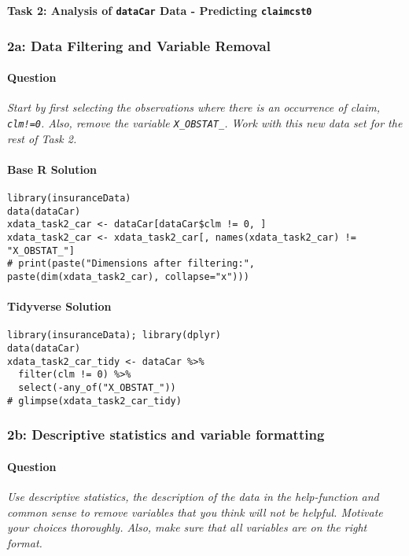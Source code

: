 \documentclass[12pt,a4paper]{article}
\newcommand{\Robject}[1]{\texttt{#1}} %
\newcommand{\Rcode}[1]{\texttt{#1}} %
\begin{document}
\vspace{1em}
\textbf{\Large Task 2: Analysis of \Robject{dataCar} Data - Predicting \Robject{claimcst0}}
\vspace{0.5em}

    \subsubsection{2a: Data Filtering and Variable Removal}
        \paragraph{Question}
        \textit{Start by first selecting the observations where there is an occurrence of claim, \Rcode{clm!=0}. Also, remove the variable \Rcode{X\_OBSTAT\_}. Work with this new data set for the rest of Task 2.}
        \paragraph{Base R Solution}
\begin{lstlisting}[]
library(insuranceData)
data(dataCar)
xdata_task2_car <- dataCar[dataCar$clm != 0, ]
xdata_task2_car <- xdata_task2_car[, names(xdata_task2_car) != "X_OBSTAT_"]
# print(paste("Dimensions after filtering:", paste(dim(xdata_task2_car), collapse="x")))
\end{lstlisting}
        \paragraph{Tidyverse Solution}
\begin{lstlisting}[]
library(insuranceData); library(dplyr)
data(dataCar)
xdata_task2_car_tidy <- dataCar %>%
  filter(clm != 0) %>%
  select(-any_of("X_OBSTAT_")) 
# glimpse(xdata_task2_car_tidy)
\end{lstlisting}

    \subsubsection{2b: Descriptive statistics and variable formatting}
        \paragraph{Question}
        \textit{Use descriptive statistics, the description of the data in the help-function and common sense to remove variables that you think will not be helpful. Motivate your choices thoroughly. Also, make sure that all variables are on the right format.}
\end{document}
